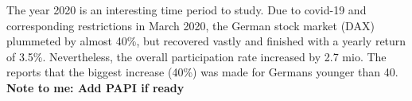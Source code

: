 \documentclass[ProjectABM]{subfiles}
\begin{document}





The year 2020 is an interesting time period to study. Due to covid-19 and corresponding restrictions in March 2020, the German stock market (DAX) plummeted by almost 40\%, but recovered vastly and finished with a yearly return of 3.5\%. Nevertheless, the overall participation rate increased by 2.7 mio. The \cite{DAI_2021} reports that the biggest increase (40\%) was made for Germans younger than 40. \textbf{Note to me: Add PAPI if ready}
\end{document}
